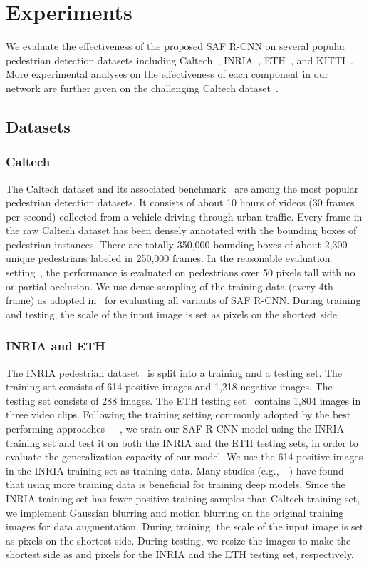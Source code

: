 \documentclass[journal]{IEEEtran}
\begin{document}
\section{Experiments}
We evaluate the effectiveness of the proposed SAF R-CNN on several popular pedestrian detection datasets including Caltech~\cite{dollar2012pedestrian}, INRIA~\cite{dalal2005histograms}, ETH~\cite{ess2007depth}, and KITTI~\cite{geiger2012we}. More experimental analyses on the effectiveness of each component in our network are further given on the challenging Caltech dataset~\cite{dollar2012pedestrian}.

\subsection{Datasets}
\subsubsection{Caltech}
The Caltech dataset and its associated benchmark~\cite{dollar2012pedestrian} are among the most popular pedestrian detection datasets. It consists of about 10 hours of  videos (30 frames per second) collected from a vehicle driving through urban traffic. Every frame in the raw Caltech dataset has been densely annotated with the bounding boxes of pedestrian instances. There are totally 350,000 bounding boxes of about 2,300 unique pedestrians labeled in 250,000 frames. In the reasonable evaluation setting~\cite{dollar2012pedestrian}, the performance is evaluated on pedestrians over 50 pixels tall with no or partial occlusion. We use dense sampling of the training data (every 4th frame) as adopted in~\cite{compact,nam2014local} for evaluating all variants of SAF R-CNN. During training and testing, the scale of the input image is set as  pixels on the shortest side. 
\subsubsection{INRIA and ETH}
The INRIA pedestrian dataset~\cite{dalal2005histograms} is split into a training and a testing set. The training set consists of 614 positive images and 1,218 negative images. The testing set consists of 288 images. The ETH testing set~\cite{ess2007depth} contains 1,804 images in three video clips. Following the training setting commonly adopted by the best performing approaches~\cite{ouyang2012discriminative}~\cite{felzenszwalb2010object}~\cite{sermanet2013pedestrian}, we train our SAF R-CNN model using the INRIA training set and test it on both the INRIA and the ETH testing sets, in order to evaluate the generalization capacity of our model. We use the 614 positive images in the INRIA training set as training data. Many studies (e.g.,~\cite{krizhevsky2012imagenet}~\cite{ranzato2007unsupervised}) have found that using more training data is beneficial for training deep models. Since the INRIA training set has fewer positive training samples than Caltech training set, we implement Gaussian blurring and motion blurring on the original training images for data augmentation. During training, the scale of the input image is set as  pixels on the shortest side. During testing, we resize the images to make the shortest side as  and  pixels for the INRIA and the ETH testing set, respectively.
\end{document}
